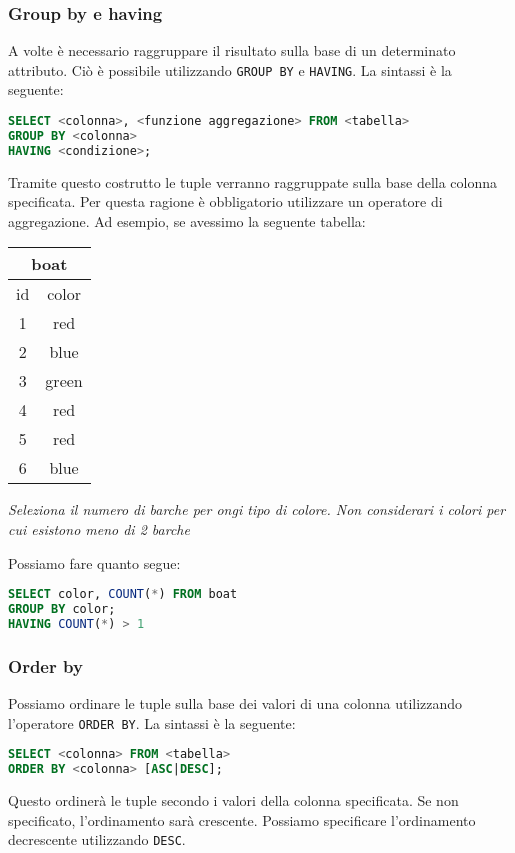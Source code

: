 \subsubsection{Group by e having}
A volte è necessario raggruppare il risultato sulla base di un determinato attributo. Ciò è possibile utilizzando \verb|GROUP BY| e \verb|HAVING|. La sintassi è la seguente:
\begin{lstlisting}[language = SQL, style = SQL, frame = none] 
SELECT <colonna>, <funzione aggregazione> FROM <tabella> 
GROUP BY <colonna> 
HAVING <condizione>; 
\end{lstlisting}
Tramite questo costrutto le tuple verranno raggruppate sulla base della colonna specificata. Per questa ragione è obbligatorio utilizzare un operatore di aggregazione.
Ad esempio, se avessimo la seguente tabella:
\vskip3mm
\begin{minipage}[c]{0.30\textwidth}
	\begin{center}
		\begin{tabular}{|c | c |}
			\multicolumn{2}{c}{boat} \\
			\hline
			id & color               \\
			\hline
			\hline
			1  & red                 \\
			2  & blue                \\
			3  & green               \\
			4  & red                 \\
			5  & red                 \\
			6  & blue                \\
			\hline
		\end{tabular}
	\end{center}
\end{minipage}
%
\begin{minipage}[c]{0.65\textwidth}
	\textit{Seleziona il numero di barche per ongi tipo di colore. Non considerari i colori per cui esistono meno di 2 barche}
\end{minipage}
\vskip3mm
Possiamo fare quanto segue:
\begin{lstlisting}[language = SQL, style = SQL, frame = none] 
SELECT color, COUNT(*) FROM boat 
GROUP BY color; 
HAVING COUNT(*) > 1
\end{lstlisting}
\subsubsection{Order by}
Possiamo ordinare le tuple sulla base dei valori di una colonna utilizzando l'operatore \verb|ORDER BY|. La sintassi è la seguente:
\begin{lstlisting}[language = SQL, style = SQL, frame = none]
SELECT <colonna> FROM <tabella>
ORDER BY <colonna> [ASC|DESC];
\end{lstlisting}
Questo ordinerà le tuple secondo i valori della colonna specificata. Se non specificato, l'ordinamento sarà crescente. Possiamo specificare l'ordinamento decrescente utilizzando \verb|DESC|.
